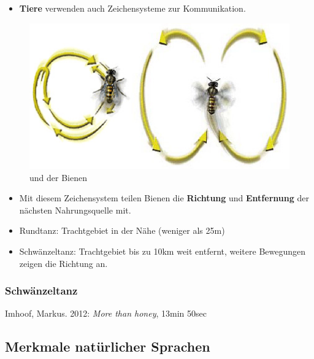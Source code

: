 \begin{frame}

\begin{itemize}
	\item<1-> \textbf{Tiere} verwenden auch Zeichensysteme zur Kommunikation.
\end{itemize}			
			
\begin{figure}[H]
\centering

\includegraphics[scale=0.15]{material/01SSBienentanz}
\caption{ und  der Bienen}
\label{Zeichen2}
\end{figure}

\begin{itemize}
	\item<2-> Mit diesem Zeichensystem teilen Bienen die \textbf{Richtung} und \textbf{Entfernung} der nächsten Nahrungsquelle mit. 
	\item<2-> Rundtanz: Trachtgebiet in der Nähe (weniger als 25m)
	\item<2-> Schwänzeltanz: Trachtgebiet bis zu 10km weit entfernt, weitere Bewegungen zeigen die Richtung an.
\end{itemize}		
		
\end{frame}			

\begin{frame}
\frametitle{Schwänzeltanz}

Imhoof, Markus. 2012: \emph{More than honey}, 13min 50sec



\end{frame}


%
\subsection{Merkmale natürlicher Sprachen}
	
